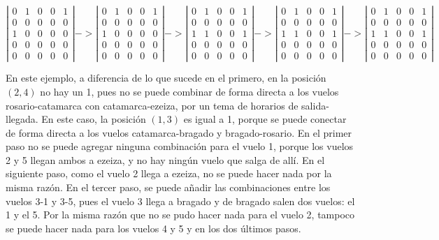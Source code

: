 \documentclass[11pt, a4paper, twoside]{article}
\begin{document}
\[ \left| \begin{array}{ccccc}
  0 & 1 & 0 & 0 & 1 \\
  0 & 0 & 0 & 0 & 0 \\
  1 & 0 & 0 & 0 & 0 \\
  0 & 0 & 0 & 0 & 0 \\
  0 & 0 & 0 & 0 & 0 \end{array} \right| ->
  \left| \begin{array}{ccccc}
  0 & 1 & 0 & 0 & 1 \\
  0 & 0 & 0 & 0 & 0 \\
  1 & 0 & 0 & 0 & 0 \\
  0 & 0 & 0 & 0 & 0 \\
  0 & 0 & 0 & 0 & 0 \end{array} \right| ->
  \left| \begin{array}{ccccc}
  0 & 1 & 0 & 0 & 1 \\
  0 & 0 & 0 & 0 & 0 \\
  1 & 1 & 0 & 0 & 1 \\
  0 & 0 & 0 & 0 & 0 \\
  0 & 0 & 0 & 0 & 0 \end{array} \right| ->
  \left| \begin{array}{ccccc}
  0 & 1 & 0 & 0 & 1 \\
  0 & 0 & 0 & 0 & 0 \\
  1 & 1 & 0 & 0 & 1 \\
  0 & 0 & 0 & 0 & 0 \\
  0 & 0 & 0 & 0 & 0 \end{array} \right| ->
  \left| \begin{array}{ccccc}
  0 & 1 & 0 & 0 & 1 \\
  0 & 0 & 0 & 0 & 0 \\
  1 & 1 & 0 & 0 & 1 \\
  0 & 0 & 0 & 0 & 0 \\
  0 & 0 & 0 & 0 & 0 \end{array} \right|
\] 

En este ejemplo, a diferencia de lo que sucede en el primero, en la posición 
$(2,4)$ no hay un 1, pues no se puede combinar de forma directa a los vuelos
rosario-catamarca con catamarca-ezeiza, por un tema de horarios de salida-llegada.
En este caso, la posición $(1,3)$ es igual a 1, porque se puede conectar de forma
directa a los vuelos catamarca-bragado y bragado-rosario. En el primer paso no se
puede agregar ninguna combinación para el vuelo 1, porque los vuelos 2 y 5 llegan
ambos a ezeiza, y no hay ningún vuelo que salga de allí. En el siguiente paso, como
el vuelo 2 llega a ezeiza, no se puede hacer nada por la misma razón. En el tercer 
paso, se puede añadir las combinaciones entre los vuelos 3-1 y 3-5, pues el vuelo 3
llega a bragado y de bragado salen dos vuelos: el 1 y el 5. Por la misma razón
que no se pudo hacer nada para el vuelo 2, tampoco se puede hacer nada para los vuelos
4 y 5 y en los dos últimos pasos. \\
\end{document}

